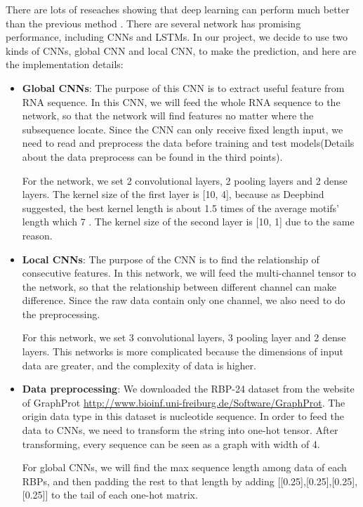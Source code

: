 \documentclass[twoside,twocolumn]{article}
\begin{document}
There are lots of reseaches showing that deep learning can perform much better than the previous method \cite{ref2}. There are several network has promising performance, including CNNs and LSTMs. In our project, we decide to use two kinds of CNNs, global CNN and local CNN, to make the prediction, and here are the implementation details:
\begin{itemize}
    \item \textbf{Global CNNs}: The purpose of this CNN is to extract useful feature from RNA sequence. In this CNN, we will feed the whole RNA sequence to the network, so that the network will find features no matter where the subsequence locate. Since the CNN can only receive fixed length input, we need to read and preprocess the data before training and test models(Details about the data preprocess can be found in the third points). 
    
    For the network, we set 2 convolutional layers, 2 pooling layers and 2 dense layers. The kernel size of the first layer is [10, 4], because as Deepbind suggested, the best kernel length is about 1.5 times of the average motifs' length which 7 \cite{ref3}. The kernel size of the second layer is [10, 1] due to the same reason.

    \item \textbf{Local CNNs}: The purpose of the CNN is to find the relationship of consecutive features. In this network, we will feed the multi-channel tensor to the network, so that the relationship between different channel can make difference. Since the raw data contain only one channel, we also need to do the preprocessing.
    
    For this network, we set 3 convolutional layers, 3 pooling layer and 2 dense layers. This networks is more complicated because the dimensions of input data are greater, and the complexity of data is higher. 

    \item \textbf{Data preprocessing}: We downloaded the RBP-24 dataset from the website of GraphProt \href{http://www.bioinf.uni-freiburg.de/Software/GraphProt}{http://www.bioinf.uni-freiburg.de/Software/GraphProt}. The origin data type in this dataset is nucleotide sequence. In order to feed the data to CNNs, we need to transform the string into one-hot tensor. After transforming, every sequence can be seen as a graph with width of 4. 
    
    For global CNNs, we will find the max sequence length among data of each RBPs, and then padding the rest to that length by adding [[0.25],[0.25],[0.25],[0.25]] to the tail of each one-hot matrix.


\end{itemize}
\end{document}
